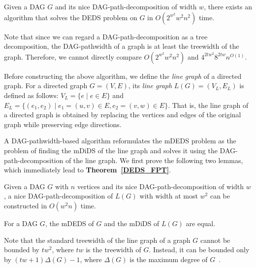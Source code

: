 \documentclass[runningheads]{llncs}
\theoremstyle{plain}
\theoremstyle{definition}
\begin{document}
\begin{theorem}\label{DEDS_FPT}
    Given a DAG \(G\) and its nice DAG-path-decomposition of width \(w\), there exists an algorithm that solves the DEDS problem on \(G\) in \(O(2^{w^2} w^2 n^2)\) time.  
\end{theorem}
%
Note that since we can regard a DAG-path-decomposition as a tree decomposition, the DAG-pathwidth of a graph is at least the treewidth of the graph. Therefore, we cannot directly compare \(O(2^{w^2} w^2 n^2)\) and \(4^{2tw^2} 8^{2tw} n^{O(1)}\).

Before constructing the above algorithm, we define the \emph{line graph} of a directed graph.  
For a directed graph \(G = (V, E)\), its \emph{line graph} \(L(G) = (V_L, E_L)\) is defined as follows:  
\(V_L = \{e \mid e \in E\}\) and \(E_L = \{(e_1, e_2) \mid e_1 = (u, v) \in E, e_2 = (v, w) \in E\}\).  
That is, the line graph of a directed graph is obtained by replacing the vertices and edges of the original graph while preserving edge directions.  

A DAG-pathwidth-based algorithm reformulates the mDEDS problem as the problem of finding the mDiDS of the line graph and solves it using the DAG-path-decomposition of the line graph.  
We first prove the following two lemmas, which immediately lead to \textbf{Theorem~\ref{DEDS_FPT}}.  

\begin{lemma}\label{DAG_path_decomposition(L(G))}
    Given a DAG \(G\) with \(n\) vertices and its nice DAG-path-decomposition of width \(w\), a nice DAG-path-decomposition of \(L(G)\) with width at most \(w^2\) can be constructed in \(O(w^2 n)\) time.  
\end{lemma}

\begin{lemma}\label{mDEDS_mDiDS}
    For a DAG \(G\), the mDEDS of \(G\) and the mDiDS of \(L(G)\) are equal.  
\end{lemma}

Note that the standard treewidth of the line graph of a graph $G$ cannot be bounded by $tw^2$, where $tw$ is the treewidth of $G$. Instead, it can be bounded only by $(tw + 1) \Delta(G) - 1$, where $\Delta(G)$ is the maximum degree of $G$~\cite{art24}.
\end{document}
